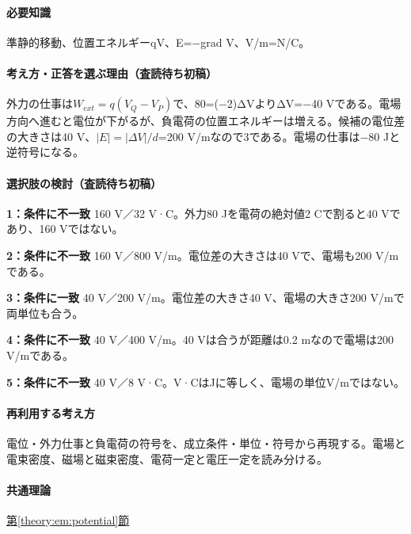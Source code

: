 \paragraph{必要知識} 準静的移動、位置エネルギーqV、E=−grad V、V/m=\allowbreak{}N/C。

\paragraph{考え方・正答を選ぶ理由（査読待ち初稿）} 外力の仕事は\(W_{ext}=q(V_Q-V_P)\)で、80=\allowbreak{}(−2)ΔVよりΔV=−40 Vである。電場方向へ進むと電位が下がるが、負電荷の位置エネルギーは増える。候補の電位差の大きさは40 V、\(|E|=|\Delta V|/d\)=200 V/mなので3である。電場の仕事は−80 Jと逆符号になる。

\paragraph{選択肢の検討（査読待ち初稿）}\mbox{}\par

\noindent\textbf{1：条件に不一致} 160 V／32 V·C。外力80 Jを電荷の絶対値2 Cで割ると40 Vであり、160 Vではない。\par

\noindent\textbf{2：条件に不一致} 160 V／800 V/m。電位差の大きさは40 Vで、電場も200 V/mである。\par

\noindent\textbf{3：条件に一致} 40 V／200 V/m。電位差の大きさ40 V、電場の大きさ200 V/mで両単位も合う。\par

\noindent\textbf{4：条件に不一致} 40 V／400 V/m。40 Vは合うが距離は0.2 mなので電場は200 V/mである。\par

\noindent\textbf{5：条件に不一致} 40 V／8 V·C。V·CはJに等しく、電場の単位V/mではない。\par

\paragraph{再利用する考え方} 電位・外力仕事と負電荷の符号を、成立条件・単位・符号から再現する。電場と電束密度、磁場と磁束密度、電荷一定と電圧一定を読み分ける。

\paragraph{共通理論} \hyperref[theory:em:potential]{第\ref*{theory:em:potential}節}

